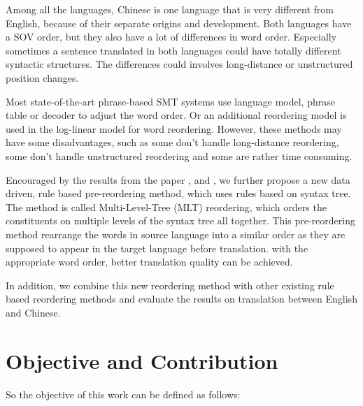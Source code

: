 Among all the languages, Chinese is one language that is very different from English, because of their separate origins and development. Both languages have a SOV order, but they also have a lot of differences in word order. Especially sometimes a sentence translated in both languages could have totally different syntactic structures. The differences could involves long-distance or unstructured position changes.

Most state-of-the-art phrase-based SMT systems use language model, phrase table or decoder to adjust the word order. Or an additional reordering model is used in the log-linear model for word reordering. However, these methods may have some disadvantages, such as some don't handle long-distance reordering, some don't handle unstructured reordering and some are rather time consuming.

Encouraged by the results from the paper \cite{short}, \cite{long} and \cite{tree}, we further propose a new data driven, rule based pre-reordering method, which uses rules based on syntax tree. The method is called Multi-Level-Tree (MLT) reordering, which orders the constituents on multiple levels of the syntax tree all together. This pre-reordering method rearrange the words in source language into a similar order as they are supposed to appear in the target language before translation. with the appropriate word order, better translation quality can be achieved.

In addition, we combine this new reordering method with other existing rule based reordering methods and evaluate the results on translation between English and Chinese. %


\section{Objective and Contribution}
\label{ch:Introduction:sec:ObjectiveAndContribution}

So the objective of this work can be defined as follows:

\begin{center}
\end{center}

